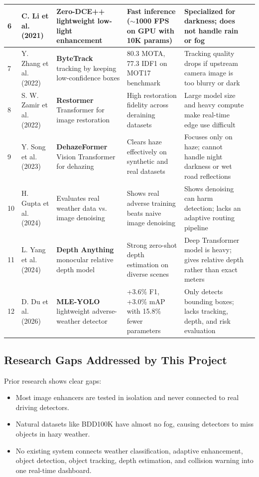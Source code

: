 \documentclass{article}
\begin{document}
\begin{longtable}{p{0.5cm} p{2.4cm} p{3.2cm} p{2.8cm} p{4.6cm} p{0.6cm}}
6 & C. Li et al. (2021) & \textbf{Zero-DCE++} lightweight low-light enhancement & Fast inference ($\sim$1000 FPS on GPU with 10K params) & Specialized for darkness; does not handle rain or fog & \cite{li2021zero} \\
\midrule

7 & Y. Zhang et al. (2022) & \textbf{ByteTrack} tracking by keeping low-confidence boxes & 80.3 MOTA, 77.3 IDF1 on MOT17 benchmark & Tracking quality drops if upstream camera image is too blurry or dark & \cite{zhang2022bytetrack} \\
\midrule

8 & S. W. Zamir et al. (2022) & \textbf{Restormer} Transformer for image restoration & High restoration fidelity across deraining datasets & Large model size and heavy compute make real-time edge use difficult & \cite{zamir2022restormer} \\
\midrule

9 & Y. Song et al. (2023) & \textbf{DehazeFormer} Vision Transformer for dehazing & Clears haze effectively on synthetic and real datasets & Focuses only on haze; cannot handle night darkness or wet road reflections & \cite{song2023dehazeformer} \\
\midrule

10 & H. Gupta et al. (2024) & Evaluates real weather data vs. image denoising & Shows real adverse training beats naive image denoising & Shows denoising can harm detection; lacks an adaptive routing pipeline & \cite{gupta2024robust} \\
\midrule

11 & L. Yang et al. (2024) & \textbf{Depth Anything} monocular relative depth model & Strong zero-shot depth estimation on diverse scenes & Deep Transformer model is heavy; gives relative depth rather than exact meters & \cite{yang2024depth} \\
\midrule

12 & D. Du et al. (2026) & \textbf{MLE-YOLO} lightweight adverse-weather detector & +3.6\% F1, +3.0\% mAP with 15.8\% fewer parameters & Only detects bounding boxes; lacks tracking, depth, and risk evaluation & \cite{du2026mleyolo} \\
\bottomrule
\end{longtable}
\endgroup

\subsection{Research Gaps Addressed by This Project}
Prior research shows clear gaps:
\begin{itemize}
    \item Most image enhancers are tested in isolation and never connected to real driving detectors.
    \item Natural datasets like BDD100K have almost no fog, causing detectors to miss objects in hazy weather.
    \item No existing system connects weather classification, adaptive enhancement, object detection, object tracking, depth estimation, and collision warning into one real-time dashboard.
\end{itemize}
\end{document}
